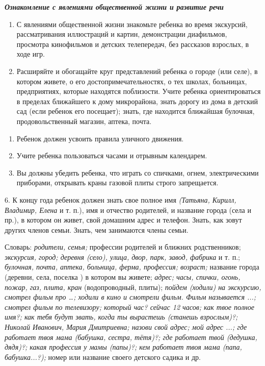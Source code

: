 \documentclass{book}
\renewcommand{\emph}[1]{\textit{#1}}
\begin{document}
\emph{\textbf{Ознакомление с явлениями общественной жизни и развитие
речи}}


\begin{enumerate}
\def\labelenumi{\arabic{enumi}.}
\item
  
  С явлениями общественной жизни знакомьте ребенка во время экскурсий,
  рассматривания иллюстраций и картин, демонстрации диафильмов,
  просмотра кинофильмов и детских телепередач, без рассказов взрослых, в
  ходе игр.
  
\item
  
  Расширяйте и обогащайте круг представлений ребенка о городе (или
  селе), в котором живете, о его достопримечательностях, о тех школах,
  больницах, предприятиях, которые находятся поблизости. Учите ребенка
  ориентироваться в пределах ближайшего к дому микрорайона, знать дорогу
  из дома в детский сад (если ребенок его посещает); знать, где
  находится ближайшая булочная, продовольственный магазин, аптека,
  почта.
  
\end{enumerate}

\begin{enumerate}
\def\labelenumi{\arabic{enumi}.}
\setcounter{enumi}{2}
\item
  
  Ребенок должен усвоить правила уличного движения.
  
\item
  
  Учите ребенка пользоваться часами и отрывным календарем.
  
\item
  
  Вы должны убедить ребенка, что играть со спичками, огнем,
  электрическими приборами, открывать краны газовой плиты строго
  запрещается.
  
\end{enumerate}


6. К концу года ребенок должен знать свое полное имя \emph{(Татьяна,
Кирилл, Владимир, Елена} и т. п.), имя и отчество родителей, и название
города (села и пр.), в котором он живет, свой домашним адрес и телефон.
Знать, как зовут других членов семьи. Знать, чем занимаются члены семьи.

Словарь: \emph{родители, семья;} профессии родителей и ближних
родственников; \emph{экскурсия, город; деревня (село), улица, двор,
парк, завод, фабрика} и т. п.; \emph{булочная, почта, аптека, больница,
ферма, профессия; возраст;} название города (деревни, села, поселка ) в
котором вы живете; \emph{адрес; часы, спички, огонь, пожар, газ, плита,
кран} (водопроводный, плиты); \emph{пойдем (ходили) на экскурсию,
смотрел фильм про \ldots; ходили в кино и смотрели фильм. Фильм}
\emph{называется ...; смотрел фильм по телевизору; который час? сейчас
12 часов; как твое полное имя?; как тебя будут звать, когда ты вырастешь
(станешь взрослым)?; Николай Иванович, Мария Дмитриевна; назови свой
адрес; мой адрес ...; где работает твоя мама (бабушка, сестра, тётя)?;
где работает твой (дедушка, дядя)?; какая профессия у мамы (папы)?; кем
работает твоя мама (папа, бабушка...?);} номер или название своего
детского садика и др.
\end{document}
